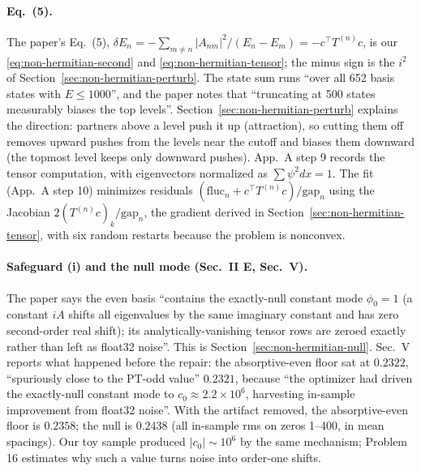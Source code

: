 \paragraph{Eq.~(5).} The paper's Eq.~(5), $\delta E_n=-\sum_{m\ne n}|A_{nm}|^2/(E_n-E_m)=-c^\top T^{(n)}c$, is our \eqref{eq:non-hermitian-second} and \eqref{eq:non-hermitian-tensor}; the minus sign is the $i^2$ of Section~\ref{sec:non-hermitian-perturb}. The state sum runs ``over all 652 basis states with $E\le1000$'', and the paper notes that ``truncating at 500 states measurably biases the top levels''. Section~\ref{sec:non-hermitian-perturb} explains the direction: partners above a level push it up (attraction), so cutting them off removes upward pushes from the levels near the cutoff and biases them downward (the topmost level keeps only downward pushes). App.~A step 9 records the tensor computation, with eigenvectors normalized as $\sum\psi^2dx=1$. The fit (App.~A step 10) minimizes residuals $(\mathrm{fluc}_n+c^\top T^{(n)}c)/\mathrm{gap}_n$ using the Jacobian $2(T^{(n)}c)_k/\mathrm{gap}_n$, the gradient derived in Section~\ref{sec:non-hermitian-tensor}, with six random restarts because the problem is nonconvex.

\paragraph{Safeguard (i) and the null mode (Sec.~II E, Sec.~V).} The paper says the even basis ``contains the exactly-null constant mode $\phi_0=1$ (a constant $iA$ shifts all eigenvalues by the same imaginary constant and has zero second-order real shift); its analytically-vanishing tensor rows are zeroed exactly rather than left as float32 noise''. This is Section~\ref{sec:non-hermitian-null}. Sec.~V reports what happened before the repair: the absorptive-even floor sat at $0.2322$, ``spuriously close to the PT-odd value'' $0.2321$, because ``the optimizer had driven the exactly-null constant mode to $c_0\approx2.2\times10^{6}$, harvesting in-sample improvement from float32 noise''. With the artifact removed, the absorptive-even floor is $0.2358$; the null is $0.2438$ (all in-sample rms on zeros 1--400, in mean spacings). Our toy sample produced $|c_0|\sim10^6$ by the same mechanism; Problem 16 estimates why such a value turns noise into order-one shifts.

